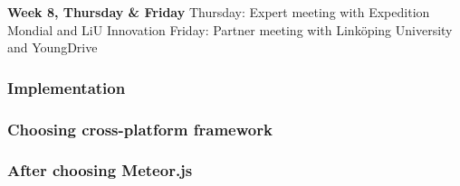 \textbf{Week 8, Thursday \& Friday}
Thursday: Expert meeting with Expedition Mondial and LiU Innovation
Friday: Partner meeting with Linköping University and YoungDrive

\subsubsection{Implementation}

\subsubsection{Choosing cross-platform framework}

\subsubsection{After choosing Meteor.js}

